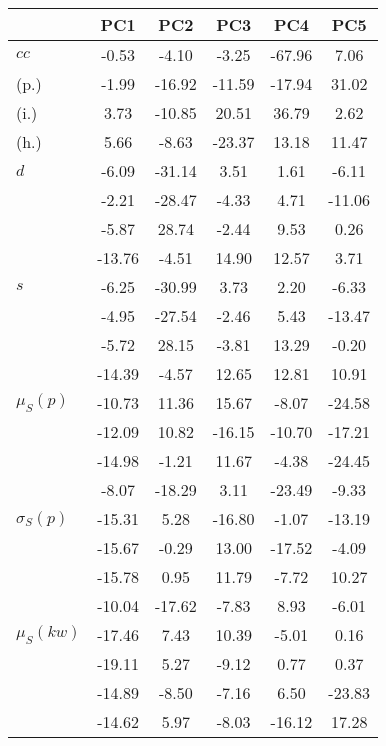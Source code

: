 \begin{table}[h!]
\begin{center}
\begin{tabular}{| l | c | c | c | c | c |}\hline
 & PC1 & PC2 & PC3 & PC4 & PC5 \\\hline
$cc$ & -0.53  & -4.10  & -3.25  & -67.96  & 7.06 \\\hline
(p.) & -1.99  & -16.92  & -11.59  & -17.94  & 31.02 \\\hline
(i.) & 3.73  & -10.85  & 20.51  & 36.79  & 2.62 \\\hline
(h.) & 5.66  & -8.63  & -23.37  & 13.18  & 11.47 \\\hline
$d$ & -6.09  & -31.14  & 3.51  & 1.61  & -6.11 \\\hline
 & -2.21  & -28.47  & -4.33  & 4.71  & -11.06 \\\hline
 & -5.87  & 28.74  & -2.44  & 9.53  & 0.26 \\\hline
 & -13.76  & -4.51  & 14.90  & 12.57  & 3.71 \\\hline
$s$ & -6.25  & -30.99  & 3.73  & 2.20  & -6.33 \\\hline
 & -4.95  & -27.54  & -2.46  & 5.43  & -13.47 \\\hline
 & -5.72  & 28.15  & -3.81  & 13.29  & -0.20 \\\hline
 & -14.39  & -4.57  & 12.65  & 12.81  & 10.91 \\\hline
$\mu_S(p)$ & -10.73  & 11.36  & 15.67  & -8.07  & -24.58 \\\hline
 & -12.09  & 10.82  & -16.15  & -10.70  & -17.21 \\\hline
 & -14.98  & -1.21  & 11.67  & -4.38  & -24.45 \\\hline
 & -8.07  & -18.29  & 3.11  & -23.49  & -9.33 \\\hline
$\sigma_S(p)$ & -15.31  & 5.28  & -16.80  & -1.07  & -13.19 \\\hline
 & -15.67  & -0.29  & 13.00  & -17.52  & -4.09 \\\hline
 & -15.78  & 0.95  & 11.79  & -7.72  & 10.27 \\\hline
 & -10.04  & -17.62  & -7.83  & 8.93  & -6.01 \\\hline
$\mu_S(kw)$ & -17.46  & 7.43  & 10.39  & -5.01  & 0.16 \\\hline
 & -19.11  & 5.27  & -9.12  & 0.77  & 0.37 \\\hline
 & -14.89  & -8.50  & -7.16  & 6.50  & -23.83 \\\hline
 & -14.62  & 5.97  & -8.03  & -16.12  & 17.28 \\\hline

\end{tabular}
\end{center}
\end{table}
